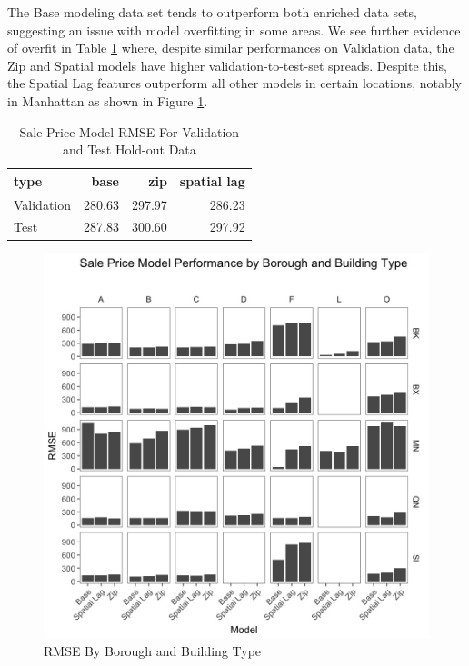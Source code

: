 \documentclass[12pt,]{article}
\begin{document}
The Base modeling data set tends to outperform both enriched data sets,
suggesting an issue with model overfitting in some areas. We see further
evidence of overfit in Table \ref{tab:SalePriceEval} where, despite
similar performances on Validation data, the Zip and Spatial models have
higher validation-to-test-set spreads. Despite this, the Spatial Lag
features outperform all other models in certain locations, notably in
Manhattan as shown in Figure \ref{fig:RMSE by boro and build type}.

\begin{table}

\caption{\label{tab:Sale Price Evaluations}\label{tab:SalePriceEval} Sale Price Model RMSE For Validation and Test Hold-out Data}
\centering
\begin{tabular}[t]{lrrr}
\toprule
type & base & zip & spatial lag\\
\midrule
Validation & 280.63 & 297.97 & 286.23\\
Test & 287.83 & 300.60 & 297.92\\
\bottomrule
\end{tabular}
\end{table}

\begin{figure}[H]
\includegraphics[width=1\linewidth]{Sections/tables and figures/RMSE by boro and build type} \caption{RMSE By Borough and Building Type}\label{fig:RMSE by boro and build type}
\end{figure}
\end{document}
